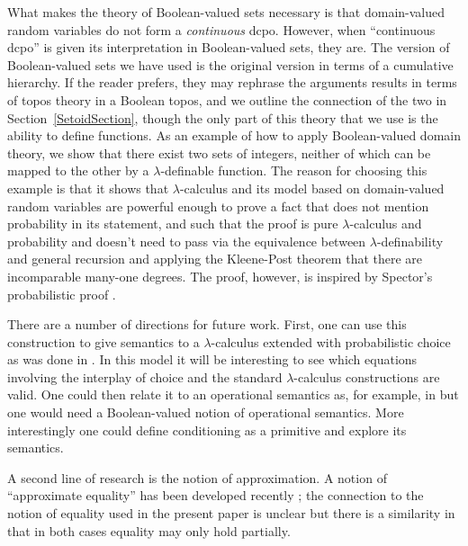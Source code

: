 \documentclass{lmcs}
\begin{document}
What makes the theory of Boolean-valued sets necessary is that domain-valued
random variables do not form a \emph{continuous} dcpo. However, when
``continuous dcpo'' is given its interpretation in Boolean-valued sets, they are.  
%
The version of Boolean-valued sets we have used is the original version in terms
of a cumulative hierarchy. If the reader prefers, they may rephrase the
arguments results in terms of topos theory in a Boolean topos, and we outline
the connection of the two in Section~\ref{SetoidSection}, though the only part
of this theory that we use is the ability to define functions.  
%
As an example of how to apply Boolean-valued domain theory, we show that there exist two sets of integers, neither of which can be mapped to the other by a $\lambda$-definable function. The reason for choosing this example is that it shows that $\lambda$-calculus and its model based on domain-valued random variables are powerful enough to prove a fact that does not mention probability in its statement, and such that the proof is pure $\lambda$-calculus and probability and doesn't need to pass via the equivalence between $\lambda$-definability and general recursion and applying the Kleene-Post theorem \cite[2.2 Corollary 1]{kleene1954} 
that there are incomparable many-one degrees. The proof, however, is inspired by Spector's probabilistic proof \cite[Theorem 2]{spector1958}.

There are a number of directions for future work.  First, one can use this construction to give semantics to a $\lambda$-calculus extended with probabilistic choice as was done in \cite{Bacci18b}.  In this model it will be interesting to see which equations involving the interplay of choice and the standard $\lambda$-calculus constructions are valid.  One could then relate it to an operational semantics as, for example, in \cite{Amorim21} but one would need a Boolean-valued notion of operational semantics.  More interestingly one could define conditioning as a primitive and explore its semantics.

 A second line of research is the notion of approximation.  A notion of ``approximate equality'' has been developed recently \cite{Mardare16}; the connection to the notion of equality used in the present paper is unclear but there is a similarity in that in both cases equality may only hold partially.

\end{document}
